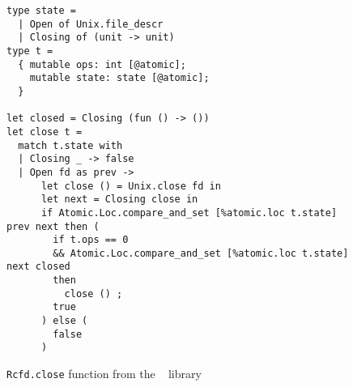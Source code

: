 \begin{figure}[tp]
\begin{verbatim}
type state =
  | Open of Unix.file_descr
  | Closing of (unit -> unit)
type t =
  { mutable ops: int [@atomic];
    mutable state: state [@atomic];
  }

let closed = Closing (fun () -> ())
let close t =
  match t.state with
  | Closing _ -> false
  | Open fd as prev ->
      let close () = Unix.close fd in
      let next = Closing close in
      if Atomic.Loc.compare_and_set [%atomic.loc t.state] prev next then (
        if t.ops == 0
        && Atomic.Loc.compare_and_set [%atomic.loc t.state] next closed
        then
          close () ;
        true
      ) else (
        false
      )
\end{verbatim}
\caption{\texttt{Rcfd.close} function from the \Eio~\cite{eio} library}
\label{fig:rcfd}
\end{figure}